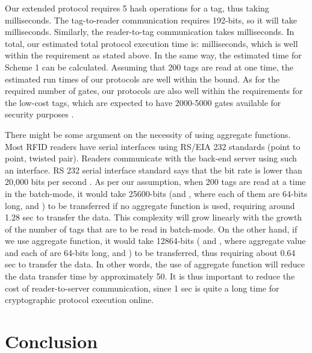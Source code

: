 \documentclass{easychair}
\begin{document}
 Our extended protocol requires 5 hash operations for a tag, thus taking  milliseconds. The tag-to-reader communication requires 192-bits, so it will take  milliseconds. Similarly, the reader-to-tag communication takes  milliseconds. In total, our estimated total protocol execution time is:  milliseconds, which is well within the requirement as stated above. In the same way, the estimated time for Scheme 1 can be calculated. Assuming that 200 tags are read at one time, the estimated run times of our protocols are well within the bound. As for the required number of gates, our protocols are also well within the requirements for the low-cost tags, which are expected to have 2000-5000 gates available for security purposes \cite{AutoID}.

There might be some argument on the necessity of using aggregate functions. Most RFID readers have serial interfaces using RS/EIA 232 standards (point to point, twisted pair)\cite{essential}. Readers communicate with the back-end server using such an interface. RS 232 serial interface standard says that the bit rate is lower than 20,000 bits per second \cite{rs232}. As per our assumption, when 200 tags are read at a time in the batch-mode, it would take 25600-bits (and , where each of them are 64-bits long, and ) to be transferred if no aggregate function is used, requiring around 1.28 sec to transfer the data. This complexity will grow linearly with the growth of the number of tags that are to be read in batch-mode. On the other hand, if we use aggregate function, it would take 12864-bits ( and , where aggregate value  and each of  are 64-bits long, and ) to be transferred, thus requiring about 0.64 sec to transfer the data. In other words, the use of aggregate function will reduce the data transfer time by approximately 50. It is thus important to reduce the cost of reader-to-server communication, since 1 sec is quite a long time for cryptographic protocol execution online. 


\section{Conclusion}
\end{document}

